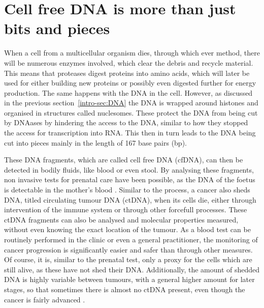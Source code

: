 \section[cfDNA]{Cell free DNA is more than just bits and pieces}
\label{intro-sec:ctDNA}

When a cell from a multicellular organism dies, through which ever method, there will be numerous enzymes involved, which clear the debris and recycle material. This means that proteases digest proteins into amino acids, which will later be used for either building new proteins or possibly even digested further for energy production. The same happens with the DNA in the cell. However, as discussed in the previous section~\ref{intro-sec:DNA} the DNA is wrapped around histones and organised in structures called nuclesomes. These protect the DNA from being cut by DNAases by hindering the access to the DNA, similar to how they stopped the access for transcription into RNA. This then in turn leads to the DNA being cut into pieces mainly in the length of 167 base pairs (bp). 

These DNA fragments, which are called cell free DNA (cfDNA), can then be detected in bodily fluids, like blood or even stool. By analysing these fragments, non invasive tests for prenatal care have been possible, as the DNA of the foetus is detectable in the mother's blood \cite{Dan2012,Nicolaides2013}.
Similar to the process, a cancer also sheds DNA, titled circulating tumour DNA (ctDNA), when its cells die, either through intervention of the immune system or through other forcefull processes. These ctDNA fragments can also be analysed and molecular properties measured, without even knowing the exact location of the tumour. As a blood test can be routinely performed in the clinic or even a general practitioner, the monitoring of cancer progression is significantly easier and safer than through other measures. Of course, it is, similar to the prenatal test, only a proxy for the cells which are still alive, as these have not shed their DNA. Additionally, the amount of shedded DNA is highly variable between tumours, with a general higher amount for later stages, so that sometimes there is almost no ctDNA present, even though the cancer is fairly advanced \cite{Diehl2008,Schwarzenbach2011}.

